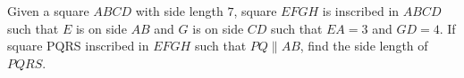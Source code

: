 Given a square $ABCD$ with side length $7$, square $EFGH$ is inscribed in $ABCD$ such that $E$ is on side $AB$ and $G$ is on side $CD$ such that $EA = 3$ and $GD = 4$. If square PQRS inscribed in $EFGH$ such that $PQ \parallel AB$, find the side length of $PQRS$.
